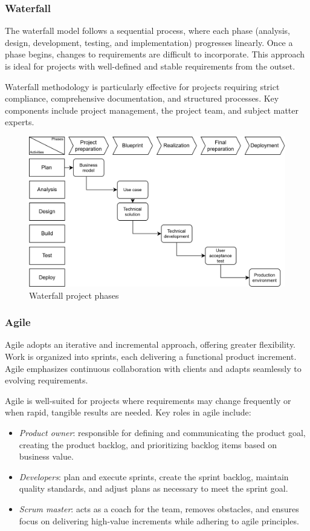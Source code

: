 \subsubsection{Waterfall}
The waterfall model follows a sequential process, where each phase (analysis, design, development, testing, and implementation) progresses linearly.
Once a phase begins, changes to requirements are difficult to incorporate. 
This approach is ideal for projects with well-defined and stable requirements from the outset.

Waterfall methodology is particularly effective for projects requiring strict compliance, comprehensive documentation, and structured processes. 
Key components include project management, the project team, and subject matter experts.

\begin{figure}[H]
    \centering
    \includegraphics[width=0.75\linewidth]{images/bis8.png}
    \caption{Waterfall project phases}
\end{figure}

\subsubsection{Agile}
Agile adopts an iterative and incremental approach, offering greater flexibility. 
Work is organized into sprints, each delivering a functional product increment. 
Agile emphasizes continuous collaboration with clients and adapts seamlessly to evolving requirements.

Agile is well-suited for projects where requirements may change frequently or when rapid, tangible results are needed.
\noindent Key roles in agile include:
\begin{itemize}
    \item \textit{Product owner}: responsible for defining and communicating the product goal, creating the product backlog, and prioritizing backlog items based on business value.
    \item \textit{Developers}: plan and execute sprints, create the sprint backlog, maintain quality standards, and adjust plans as necessary to meet the sprint goal.
    \item \textit{Scrum master}: acts as a coach for the team, removes obstacles, and ensures focus on delivering high-value increments while adhering to agile principles.
\end{itemize}

